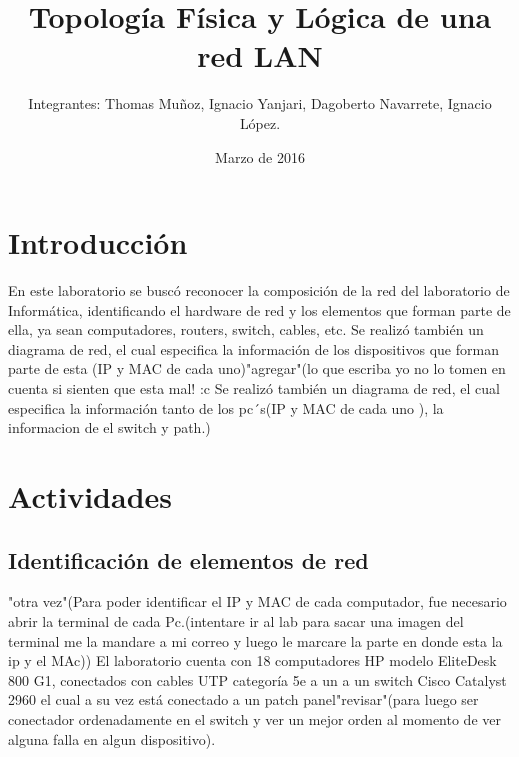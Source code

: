 \documentclass{udpreport}
\title{Topología Física y Lógica de una red LAN}
\author{Integrantes: Thomas Muñoz, Ignacio Yanjari, Dagoberto Navarrete, Ignacio López.}
\date{Marzo de 2016}
\begin{document}
\maketitle
\tableofcontents %
\chapter{Introducción}
En este laboratorio se buscó reconocer la composición de la red del laboratorio de Informática, identificando el hardware de red y los elementos que forman parte de ella, ya sean computadores, routers, switch, cables, etc. Se realizó también un diagrama de red, el cual especifica la información de los dispositivos que forman parte de esta (IP y MAC de cada uno)"agregar"(lo que escriba yo no lo tomen en cuenta si sienten que esta mal! :c  Se realizó también un diagrama de red, el cual especifica la información tanto de los pc´s(IP y MAC de cada uno ), la informacion de el switch y path.)
\chapter{Actividades}
\section{Identificación de elementos de red}
"otra vez"(Para poder identificar el IP y MAC de cada computador, fue necesario abrir la terminal de cada Pc.(intentare ir al lab para sacar una imagen del terminal me la mandare a mi correo y luego le marcare la parte en donde esta la ip y el MAc))
El laboratorio cuenta con 18 computadores HP modelo EliteDesk 800 G1, conectados con cables UTP categoría 5e a un a un switch Cisco Catalyst 2960 el cual a su vez está conectado a un patch panel"revisar"(para luego ser conectador ordenadamente en el switch y ver un mejor orden al momento de ver alguna falla en algun dispositivo).
\end{document}
